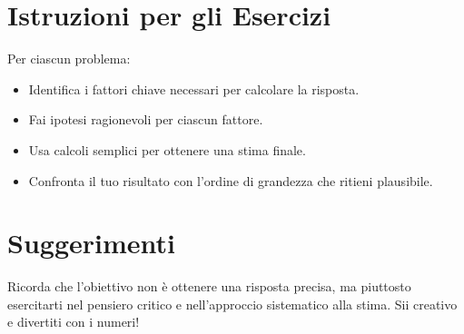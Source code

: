\documentclass[a4paper,10pt]{article}
\begin{document}
\section*{Istruzioni per gli Esercizi}
Per ciascun problema:
\begin{itemize}
    \item Identifica i fattori chiave necessari per calcolare la risposta.
    \item Fai ipotesi ragionevoli per ciascun fattore.
    \item Usa calcoli semplici per ottenere una stima finale.
    \item Confronta il tuo risultato con l'ordine di grandezza che ritieni plausibile.
\end{itemize}

\section*{Suggerimenti}
Ricorda che l'obiettivo non è ottenere una risposta precisa, ma piuttosto esercitarti nel pensiero critico e nell'approccio sistematico alla stima. Sii creativo e divertiti con i numeri!
\end{document}
